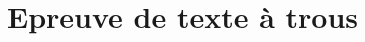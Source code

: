\documentclass[11pt]{scrreprt}
\begin{document}
    \section{Epreuve de texte à trous}
    \begin{figure}[H]
        \centering
        \mbox{\quad\quad\quad
}
\end{figure}
\end{document}

